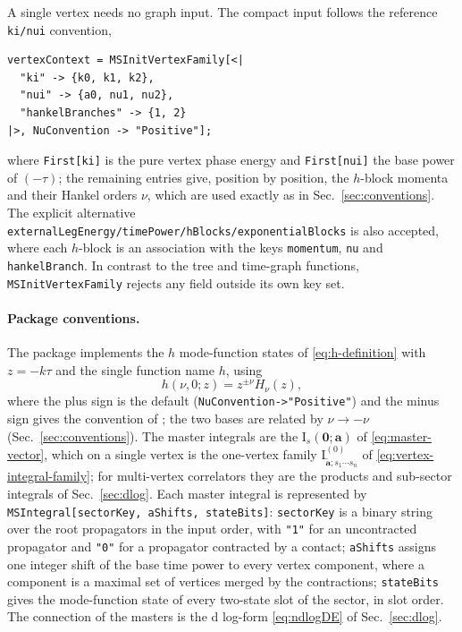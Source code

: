 \documentclass[11pt,a4paper]{article}
\begin{document}
A single vertex needs no graph input. The compact input follows the reference
\texttt{ki/nui} convention,
\begin{verbatim}
vertexContext = MSInitVertexFamily[<|
  "ki" -> {k0, k1, k2},
  "nui" -> {a0, nu1, nu2},
  "hankelBranches" -> {1, 2}
|>, NuConvention -> "Positive"];
\end{verbatim}
where \texttt{First[ki]} is the pure vertex phase energy and \texttt{First[nui]} the base power of
$(-\tau)$; the remaining entries give, position by position, the $h$-block momenta and their Hankel
orders $\nu$, which are used exactly as in Sec.~\ref{sec:conventions}. The explicit alternative
\texttt{externalLegEnergy/timePower/hBlocks/exponentialBlocks} is also accepted, where each
$h$-block is an association with the keys \texttt{momentum}, \texttt{nu} and
\texttt{hankelBranch}. In contrast to the tree and time-graph functions, \texttt{MSInitVertexFamily} rejects any
field outside its own key set.

\paragraph{Package conventions.}
\label{sec:package}

The package implements the $h$ mode-function states of \eqref{eq:h-definition} with $z=-k\tau$ and the
single function name $h$, using
\begin{equation}
  h(\nu,0;z)=z^{\pm\nu}H_\nu(z),
  \label{eq:positive-order-h}
\end{equation}
where the plus sign is the default (\texttt{NuConvention->"Positive"}) and the minus sign gives
the convention of \cite{Chen:2023iix}; the two bases are related by $\nu\to-\nu$
(Sec.~\ref{sec:conventions}). The master integrals are the
$\text{I}_s(\bm 0;\bm a)$ of \eqref{eq:master-vector}, which on a single vertex is the one-vertex
family $\text{I}^{(0)}_{\tilde{\bm a};s_1\cdots s_n}$ of \eqref{eq:vertex-integral-family}; for
multi-vertex correlators they are the products and
sub-sector integrals of Sec.~\ref{sec:dlog}. Each master integral is represented by
\texttt{MSIntegral[sectorKey, aShifts, stateBits]}: \texttt{sectorKey} is a binary string over
the root propagators in the input order, with \texttt{"1"} for an uncontracted propagator and
\texttt{"0"} for a propagator contracted by a contact; \texttt{aShifts} assigns one integer shift of
the base time power to every vertex component, where a component is a maximal set of vertices
merged by the contractions; \texttt{stateBits} gives the mode-function state of every two-state slot of the
sector, in slot order. The connection of the masters
is the d log-form \eqref{eq:ndlogDE} of Sec.~\ref{sec:dlog}.
\end{document}
